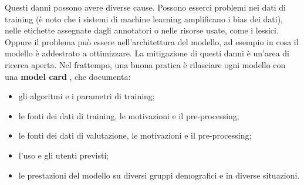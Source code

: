 Questi danni possono avere diverse cause. Possono esserci problemi nei dati di training (è noto che i sistemi di machine learning amplificano i bias dei dati), nelle etichette assegnate dagli annotatori o nelle risorse usate, come i lessici. Oppure il problema può essere nell'architettura del modello, ad esempio in cosa il modello è addestrato a ottimizzare. La mitigazione di questi danni è un'area di ricerca aperta. Nel frattempo, una buona pratica è rilasciare ogni modello con una \textbf{model card} \cite{mitchell2019}, che documenta:
\begin{itemize}
    \item gli algoritmi e i parametri di training;
    \item le fonti dei dati di training, le motivazioni e il pre-processing;
    \item le fonti dei dati di valutazione, le motivazioni e il pre-processing;
    \item l'uso e gli utenti previsti;
    \item le prestazioni del modello su diversi gruppi demografici e in diverse situazioni.
\end{itemize}
